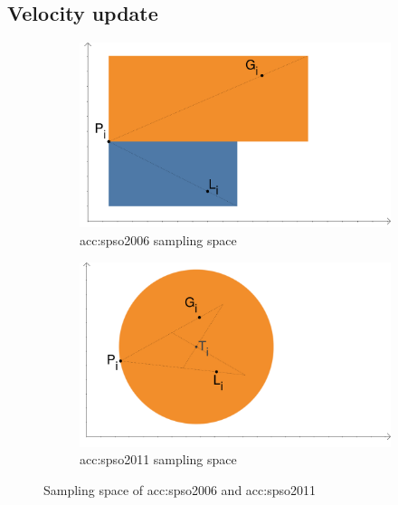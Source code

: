 \subsection{Velocity update}

\begin{figure}[t]
    \begin{subfigure}[t]{0.45\textwidth}
        \includegraphics[width=\textwidth]{img/pso2006.pdf}
        \caption{\acrshort*{acc:spso2006} sampling space}
        \label{fig:samplingspso2006}
    \end{subfigure}
    \hfill
    \begin{subfigure}[t]{0.45\textwidth}
        \includegraphics[width=\textwidth]{img/pso2011.pdf}
        \caption{\acrshort*{acc:spso2011} sampling space}
        \label{fig:samplingspso2011}
    \end{subfigure}
    \caption{Sampling space of \acrshort*{acc:spso2006} and \acrshort*{acc:spso2011}}
\end{figure}

